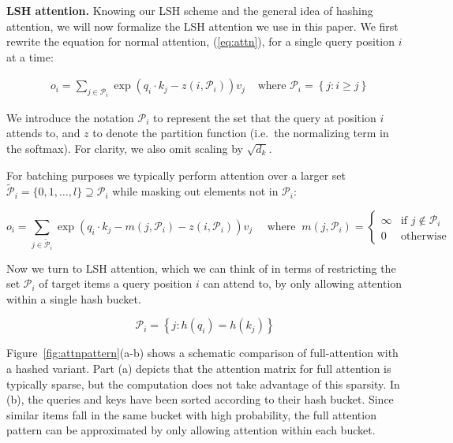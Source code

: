 \textbf{LSH attention.} Knowing our LSH scheme and the general idea of hashing attention, we will now formalize the LSH attention we use in this paper. We first rewrite the equation for normal attention, (\ref{eq:attn}), for a single query position $i$ at a time:

\begin{align}
    &o_i = \sum_{j \in \mathcal{P}_i} \exp \left(q_i \cdot k_j - z(i, \mathcal{P}_i) \right) v_j
    &\text{ where } \mathcal{P}_i = \left\{j : i \geq j \right\}
\end{align}

We introduce the notation $\mathcal{P}_i$ to represent the set that the query at position $i$ attends to, and $z$ to denote the partition function (i.e.\ the normalizing term in the softmax). For clarity, we also omit scaling by $\sqrt{d_k}$.

For batching purposes we typically perform attention over a larger set $\widetilde{\mathcal{P}}_i = \{0, 1, \ldots, l\} \supseteq \mathcal{P}_i$ while masking out elements not in $\mathcal{P}_i$:

\begin{equation}\label{eq:attn-masked}
    o_i = \sum_{j \in \widetilde{\mathcal{P}}_i} \exp \left(q_i \cdot k_j - m(j, \mathcal{P}_i) - z(i, \mathcal{P}_i) \right) v_j \quad
    \text{ where } \ m(j, \mathcal{P}_i) = \begin{cases}
    \infty & \text{if } j \notin \mathcal{P}_i\\
    0 & \text{otherwise}
    \end{cases}
\end{equation}

Now we turn to LSH attention, which we can think of in terms of restricting the set $\mathcal{P}_i$ of target items a query position $i$ can attend to, by only allowing attention within a single hash bucket.

\begin{equation}
    \mathcal{P}_i = \left\{ j : h(q_i) = h(k_j) \right\}
\end{equation}

Figure~\ref{fig:attnpattern}(a-b) shows a schematic comparison of full-attention with a hashed variant. Part (a) depicts that the attention matrix for full attention is typically sparse, but the computation does not take advantage of this sparsity. In (b), the queries and keys have been sorted according to their hash bucket. Since similar items fall in the same bucket with high probability, the full attention pattern can be approximated by only allowing attention within each bucket.

